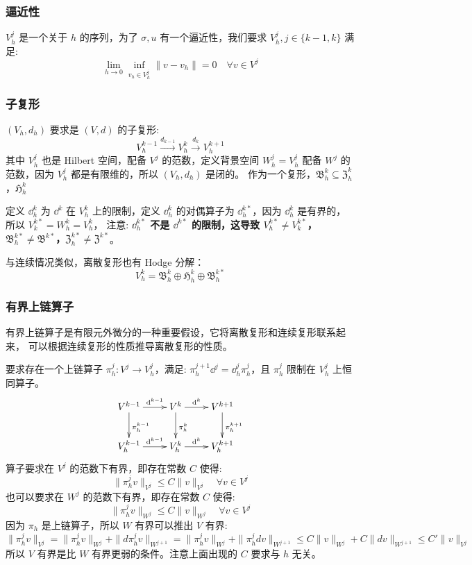 \documentclass[lang=cn,a4paper,newtx]{elegantpaper}
\begin{document}
\subsubsection{逼近性}
$V_h^j$ 是一个关于 $h$ 的序列，为了 $\sigma, u$ 有一个逼近性，我们要求 $V_h^j, j
\in \{k-1, k\}$ 满足:
$$
\lim_{h\to 0} \inf_{v_h\in V_h^j} \|v - v_h\| = 0 \quad \forall v \in V^j
$$

\subsubsection{子复形}
$(V_h, d_h)$ 要求是 $(V, d)$ 的子复形:
$$
V_h^{k-1} \xrightarrow{d_{k-1}} V_h^k \xrightarrow{d_{k}} V_h^{k+1}   
$$
其中 $V_h^j$ 也是 Hilbert 空间，配备 $V^j$ 的范数，定义背景空间 $W_h^j = V_h^j$
配备 $W^j$ 的范数，因为 $V_h^j$ 都是有限维的，所以 $(V_h, d_h)$ 是闭的。
作为一个复形，$\mathfrak{B}_h^k \subseteq \mathfrak{Z}^k_h$，$\mathfrak{H}_h^k$

定义 $\dd^{k}_h$ 为 $\dd^k$ 在 $V_h^k$ 上的限制，定义 $\dd^k_h$ 的对偶算子为
$\dd^{k*}_h$，因为 $\dd^k_h$ 是有界的，所以 $V_k^{k*} = W_h^k = V_h^k$，
注意: \textbf{$\dd_h^{k*}$ 不是 $\dd^{k*}$ 的限制，这导致 $V_h^{k*} \neq
V_k^{k*}$，$\mathfrak{B}_h^{k*} \neq \mathfrak{B}^{k*}$，$\mathfrak{Z}_h^{k*}
\neq \mathfrak{Z}^{k*}$}。

与连续情况类似，离散复形也有 Hodge 分解：
$$
V_h^k = \mathfrak{B}_h^k \oplus \mathfrak{H}_h^k \oplus \mathfrak{B}_h^{k*}
$$

\subsubsection{有界上链算子}
有界上链算子是有限元外微分的一种重要假设，它将离散复形和连续复形联系起来，
可以根据连续复形的性质推导离散复形的性质。

要求存在一个上链算子 $\pi_h^j: V^j \to V_h^j$，满足: $\pi_h^{j+1}\dd^j =
\dd_h^j\pi_h^{j}$，且 $\pi_h^j$ 限制在 $V_h^j$ 上恒同算子。
$$
\begin{array}{c}
\xymatrix{
  V^{k-1} \ar[r]^-{\dd^{k-1}} \ar[d]^{\pi_h^{k-1}} & V^k \ar[r]^-{\dd^k}
  \ar[d]^{\pi_h^k} & V^{k+1} \ar[d]^{\pi_h^{k+1}}   \\
  V_h^{k-1} \ar[r]^-{\dd^{k-1}} & V_h^k \ar[r]^-{\dd^k} & V_h^{k+1}   }
\end{array}
$$
算子要求在 $V^j$ 的范数下有界，即存在常数 $C$ 使得:
$$
\|\pi_h^j v\|_{V^j} \leq C\|v\|_{V^j} \quad \forall v \in V^j
$$
也可以要求在 $W^j$ 的范数下有界，即存在常数 $C$ 使得:
$$
\|\pi_h^j v\|_{W^j} \leq C\|v\|_{W^j} \quad \forall v \in V^j
$$
因为 $\pi_h$ 是上链算子，所以 $W$ 有界可以推出 $V$ 有界:
$$
\|\pi_h^j v\|_{V^j} = \|\pi_h^j v\|_{W^j} + \|d\pi_h^j v\|_{W^{j+1}} = 
\|\pi_h^j v\|_{W^j} + \|\pi_h^j dv\|_{W^{j+1}} \leq C\|v\|_{W^j} + 
C\|dv\|_{W^{j+1}} \leq C'\|v\|_{V^j}
$$
所以 $V$ 有界是比 $W$ 有界更弱的条件。注意上面出现的 $C$ 要求与 $h$ 无关。
\end{document}
